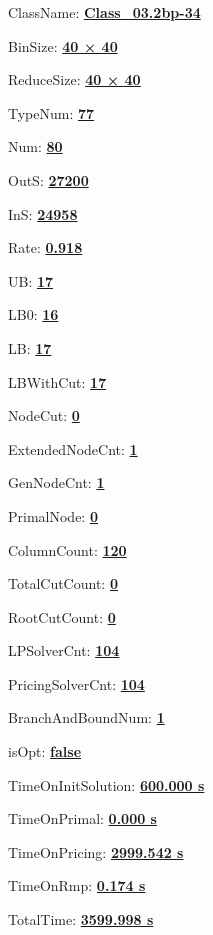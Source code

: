 \documentclass[11pt]{article}
\begin{document}
\pagestyle{empty}


ClassName: \underline{\textbf{Class_03.2bp-34}}
\par
BinSize: \underline{\textbf{40 × 40}}
\par
ReduceSize: \underline{\textbf{40 × 40}}
\par
TypeNum: \underline{\textbf{77}}
\par
Num: \underline{\textbf{80}}
\par
OutS: \underline{\textbf{27200}}
\par
InS: \underline{\textbf{24958}}
\par
Rate: \underline{\textbf{0.918}}
\par
UB: \underline{\textbf{17}}
\par
LB0: \underline{\textbf{16}}
\par
LB: \underline{\textbf{17}}
\par
LBWithCut: \underline{\textbf{17}}
\par
NodeCut: \underline{\textbf{0}}
\par
ExtendedNodeCnt: \underline{\textbf{1}}
\par
GenNodeCnt: \underline{\textbf{1}}
\par
PrimalNode: \underline{\textbf{0}}
\par
ColumnCount: \underline{\textbf{120}}
\par
TotalCutCount: \underline{\textbf{0}}
\par
RootCutCount: \underline{\textbf{0}}
\par
LPSolverCnt: \underline{\textbf{104}}
\par
PricingSolverCnt: \underline{\textbf{104}}
\par
BranchAndBoundNum: \underline{\textbf{1}}
\par
isOpt: \underline{\textbf{false}}
\par
TimeOnInitSolution: \underline{\textbf{600.000 s}}
\par
TimeOnPrimal: \underline{\textbf{0.000 s}}
\par
TimeOnPricing: \underline{\textbf{2999.542 s}}
\par
TimeOnRmp: \underline{\textbf{0.174 s}}
\par
TotalTime: \underline{\textbf{3599.998 s}}
\par
\newpage


\end{document}
